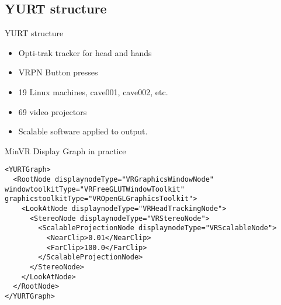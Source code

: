 \documentclass[12pt]{article}
\begin{document}
\subsection{YURT structure}


\begin{frame}{YURT structure}

\begin{center}

\begin{minipage}{0.9\columnwidth}
\begin{itemize}

\item Opti-trak tracker for head and hands

\item VRPN Button presses

\item 19 Linux machines, cave001, cave002, etc.

\item 69 video projectors

\item Scalable software applied to output.

\end{itemize}
\end{minipage}
\end{center}

\end{frame}

\begin{frame}[fragile]{MinVR Display Graph in practice}

\begin{Verbatim}[fontsize=\footnotesize]
<YURTGraph>
  <RootNode displaynodeType="VRGraphicsWindowNode" windowtoolkitType="VRFreeGLUTWindowToolkit" graphicstoolkitType="VROpenGLGraphicsToolkit">
    <LookAtNode displaynodeType="VRHeadTrackingNode">
      <StereoNode displaynodeType="VRStereoNode">
        <ScalableProjectionNode displaynodeType="VRScalableNode">
          <NearClip>0.01</NearClip>
          <FarClip>100.0</FarClip>
        </ScalableProjectionNode>
      </StereoNode>
    </LookAtNode>
  </RootNode>
</YURTGraph>
\end{Verbatim}
\end{frame}
\end{document}
